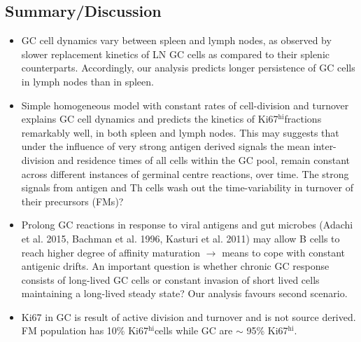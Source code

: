 \documentclass[11pt]{article}
\newcommand{\khi}{Ki67$^\text{hi}$}
\begin{document}
	 
	\subsection*{Summary/Discussion}
	\begin{itemize}
		\item GC cell dynamics vary between spleen and lymph nodes, as observed by slower replacement kinetics of LN GC cells  as compared to their splenic counterparts.
		Accordingly, our analysis predicts longer persistence of GC cells in lymph nodes than in spleen.
		
		\item Simple homogeneous model with constant rates of cell-division and turnover explains GC cell dynamics and predicts the kinetics of \khi fractions remarkably well, in both spleen and lymph nodes.
		This may suggests that under the influence of very strong antigen derived signals the mean inter-division and residence times of all cells within the GC pool, remain constant across different instances of germinal centre reactions, over time.
		The strong signals from antigen and Th cells wash out the time-variability in turnover of their precursors (FMs)?
		
		\item Prolong GC reactions in response to viral antigens and gut microbes (Adachi et al. 2015, Bachman et al. 1996, Kasturi et al. 2011) may allow B cells to reach higher degree of affinity maturation $\rightarrow$ means to cope with constant antigenic drifts. 
		An important question is whether chronic GC response consists of long-lived GC cells or constant invasion of short lived cells maintaining a long-lived steady state? Our analysis favours second scenario. 
		
		\item Ki67 in GC is result of active division and turnover and is not source derived. FM population has 10\% \khi cells while GC are $\sim$ 95\% \khi. 
	\end{itemize}
	   
\end{document}
